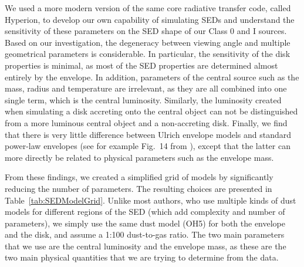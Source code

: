 We used a more modern version of the same core radiative transfer code, called Hyperion, to develop our own capability of simulating SEDs and understand the sensitivity of these parameters on the SED shape of our Class 0 and I sources. Based on our investigation, the degeneracy between viewing angle and multiple geometrical parameters is considerable. In particular, the sensitivity of the disk properties is minimal, as most of the SED properties are determined almost entirely by the envelope. In addition, parameters of the central source such as the mass, radius and temperature are irrelevant, as they are all combined into one single term, which is the central luminosity. Similarly, the luminosity created when simulating a disk accreting onto the central object can not be distinguished from a more luminous central object and a non-accreting disk. Finally, we find that there is very little difference between Ulrich envelope models and standard power-law envelopes (see for example Fig.~14 from \citet{Whitney:2013cw}), except that the latter can more directly be related to physical parameters such as the envelope mass. 

From these findings, we created a simplified grid of models by significantly reducing the number of parameters. The resulting choices are presented in Table~\ref{tab:SEDModelGrid}. Unlike most authors, who use multiple kinds of dust models for different regions of the SED (which add complexity and number of parameters), we simply use the same dust model (OH5) for both the envelope and the disk, and assume a 1:100 dust-to-gas ratio. The two main parameters that we use are the central luminosity and the envelope mass, as these are the two main physical quantities that we are trying to determine from the data. 


